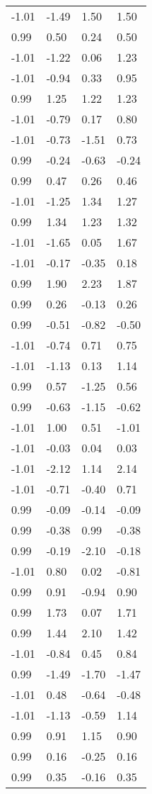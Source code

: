 \documentclass[
  doc,draftall]{apa6}
\begin{document}
\begin{table}[tbp]
\begin{center}
\begin{threeparttable}
\begin{tabular}{llll}
-1.01 & -1.49 & 1.50 & 1.50\\
0.99 & 0.50 & 0.24 & 0.50\\
-1.01 & -1.22 & 0.06 & 1.23\\
-1.01 & -0.94 & 0.33 & 0.95\\
0.99 & 1.25 & 1.22 & 1.23\\
-1.01 & -0.79 & 0.17 & 0.80\\
-1.01 & -0.73 & -1.51 & 0.73\\
0.99 & -0.24 & -0.63 & -0.24\\
0.99 & 0.47 & 0.26 & 0.46\\
-1.01 & -1.25 & 1.34 & 1.27\\
0.99 & 1.34 & 1.23 & 1.32\\
-1.01 & -1.65 & 0.05 & 1.67\\
-1.01 & -0.17 & -0.35 & 0.18\\
0.99 & 1.90 & 2.23 & 1.87\\
0.99 & 0.26 & -0.13 & 0.26\\
0.99 & -0.51 & -0.82 & -0.50\\
-1.01 & -0.74 & 0.71 & 0.75\\
-1.01 & -1.13 & 0.13 & 1.14\\
0.99 & 0.57 & -1.25 & 0.56\\
0.99 & -0.63 & -1.15 & -0.62\\
-1.01 & 1.00 & 0.51 & -1.01\\
-1.01 & -0.03 & 0.04 & 0.03\\
-1.01 & -2.12 & 1.14 & 2.14\\
-1.01 & -0.71 & -0.40 & 0.71\\
0.99 & -0.09 & -0.14 & -0.09\\
0.99 & -0.38 & 0.99 & -0.38\\
0.99 & -0.19 & -2.10 & -0.18\\
-1.01 & 0.80 & 0.02 & -0.81\\
0.99 & 0.91 & -0.94 & 0.90\\
0.99 & 1.73 & 0.07 & 1.71\\
0.99 & 1.44 & 2.10 & 1.42\\
-1.01 & -0.84 & 0.45 & 0.84\\
0.99 & -1.49 & -1.70 & -1.47\\
-1.01 & 0.48 & -0.64 & -0.48\\
-1.01 & -1.13 & -0.59 & 1.14\\
0.99 & 0.91 & 1.15 & 0.90\\
0.99 & 0.16 & -0.25 & 0.16\\
0.99 & 0.35 & -0.16 & 0.35\\

\end{tabular}
\end{threeparttable}
\end{center}
\end{table}
\end{document}
